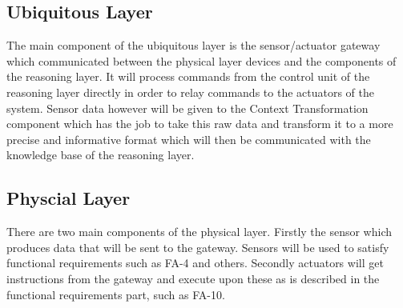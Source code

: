 \documentclass[runningheads]{llncs}
\begin{document}
    \subsection{Ubiquitous Layer}
    The main component of the ubiquitous layer is the sensor/actuator gateway which communicated between the physical layer devices and the components of the reasoning layer. It will process commands from the control unit of the reasoning layer directly in order to relay commands to the actuators of the system. Sensor data however will be given to the Context Transformation component which has the job to take this raw data and transform it to a more precise and informative format which will then be communicated with the knowledge base of the reasoning layer.

    \subsection{Physcial Layer}
    There are two main components of the physical layer. Firstly the sensor which produces data that will be sent to the gateway. Sensors will be used to satisfy functional requirements such as FA-4 and others. Secondly actuators will get instructions from the gateway and execute upon these as is described in the functional requirements part, such as FA-10.



%
%
%
%

\end{document}
